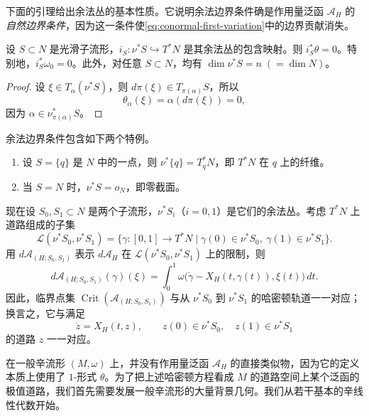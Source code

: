 下面的引理给出余法丛的基本性质。它说明余法边界条件确是作用量泛函 $\mathcal A_H$ 的\emph{自然边界条件}，因为这一条件使\eqref{eq:conormal-first-variation}中的边界贡献消失。

\begin{lemma}\label{lem:conormal-tautological-vanishing}
设 $S\subset N$ 是光滑子流形，$i_S:\nu^*S\hookrightarrow T^*N$ 是其余法丛的包含映射。则
$i_S^*\theta=0$。特别地，$i_S^*\omega_0=0$。此外，对任意 $S\subset N$，均有
$\dim\nu^*S=n\;(=\dim N)$。
\end{lemma}

\begin{proof}
设 $\xi\in T_\alpha(\nu^*S)$，则 $d\pi(\xi)\in T_{\pi(\alpha)}S$，所以
\[
 \theta_\alpha(\xi)=\alpha(d\pi(\xi))=0,
\]
因为 $\alpha\in\nu^*_{\pi(\alpha)}S$。
\end{proof}

余法边界条件包含如下两个特例。

\begin{example}\label{ex:conormal-special-cases}
\begin{enumerate}[label=(\arabic*)]
\item 设 $S=\{q\}$ 是 $N$ 中的一点，则 $\nu^*\{q\}=T_q^*N$，即 $T^*N$ 在 $q$ 上的纤维。
\item 当 $S=N$ 时，$\nu^*S=o_N$，即零截面。
\end{enumerate}
\end{example}

现在设 $S_0,S_1\subset N$ 是两个子流形，$\nu^*S_i$（$i=0,1$）是它们的余法丛。考虑 $T^*N$ 上道路组成的子集
\[
 \mathcal L(\nu^*S_0,\nu^*S_1)
 =\{\gamma:[0,1]\to T^*N\mid
       \gamma(0)\in\nu^*S_0,\ \gamma(1)\in\nu^*S_1\}.
\]
用 $d\mathcal A_{(H;S_0,S_1)}$ 表示 $d\mathcal A_H$ 在
$\mathcal L(\nu^*S_0,\nu^*S_1)$ 上的限制，则
\[
 d\mathcal A_{(H;S_0,S_1)}(\gamma)(\xi)
 =\int_0^1\omega\bigl(\dot\gamma-X_H(t,\gamma(t)),\xi(t)\bigr)\,dt.
\]
因此，临界点集 $\operatorname{Crit}(\mathcal A_{(H;S_0,S_1)})$ 与从
$\nu^*S_0$ 到 $\nu^*S_1$ 的哈密顿轨道一一对应；换言之，它与满足
\[
 \dot z=X_H(t,z),\qquad z(0)\in\nu^*S_0,\quad z(1)\in\nu^*S_1
\]
的道路 $z$ 一一对应。

在一般辛流形 $(M,\omega)$ 上，并没有作用量泛函 $\mathcal A_H$ 的直接类似物，因为它的定义本质上使用了 $1$-形式 $\theta$。为了把上述哈密顿方程看成 $M$ 的道路空间上某个泛函的极值道路，我们首先需要发展一般辛流形的大量背景几何。我们从若干基本的辛线性代数开始。
